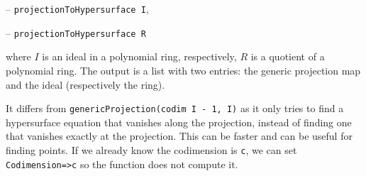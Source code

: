 \documentclass[11pt]{amsart}
\theoremstyle{definition}
\begin{document}
\vspace{0.5em}
-- {\tt projectionToHypersurface I},

-- {\tt projectionToHypersurface R} 
\vspace{0.5em}

\noindent where $I$ is an ideal in a polynomial ring, respectively, $R$ is a quotient of a polynomial ring. The output is
a list with two entries: the generic projection map and the ideal (respectively the ring).

It differs from {\tt genericProjection(codim I - 1, I)} as it only tries to find a hypersurface equation that vanishes along the projection, instead of finding one that vanishes exactly at the projection.  This can be faster and can be useful for finding points.   If we already know the codimension is {\tt c}, we can set {\tt Codimension=>c} so the function does not compute it. 

\begin{comment}~~

  ~~
  
  {{\small\color{blue}
\begin{verbatim}
	i2 : R = ZZ/5[x, y, z];
	
	i3 : I = ideal(random(3, R) - 2, random(2, R));
	
	o3 : Ideal of R
	
	i4 : projectionToHypersurface(I)
	
	            ZZ                             4    3      2 2     4
	o4 = (map(R,--[y, z],{x + 2y, 2y}), ideal(y  + y z - 2y z  - 2z  - y - z))
	            5
	
    o4 : Sequence

	i5 : projectionToHypersurface(R/I)
	
	
	
                           	                    R                    
	o5 = (map(--------------------------------------------------------------
	    3       2     3            2        2       2       2     
	(- x  - 2x*y  - 2y  - x*y*z + y z - 2x*z  + 2y*z  - 2, x  - 2x
	-------------------------------------------------------------------
                                    ZZ                       
	                                    --[y, z]                 
	                                    5                       
	--------------------,----------------------------------------------
	      2               4 2    3 3       5     6     3       2     3 
	*y - y  + x*z - y*z) y z  + y z  - 2y*z  + 2z  + 2y  + 2y*z  + 2z  
	-------------------------------------------------------------------
                    	       ZZ
                	           --[y, z]
	                            5
	---,{x - z, y}), -------------------------------------------------)
	                  4 2    3 3       5     6     3       2     3
	- 1              y z  + y z  - 2y*z  + 2z  + 2y  + 2y*z  + 2z  - 1
	
	o5 : Sequence
	\end{verbatim}
    }}
\end{comment}
\end{document}
